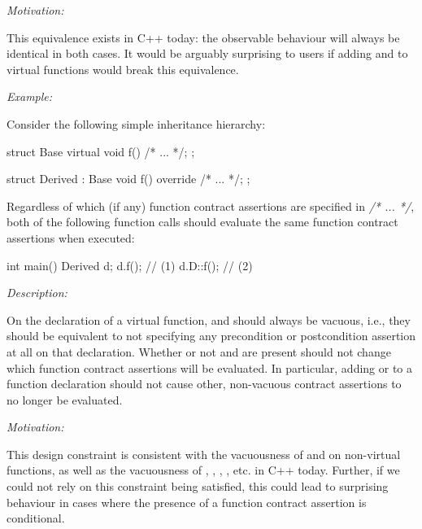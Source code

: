 \emph{Motivation:}

This equivalence exists in C++ today: the observable behaviour will always be identical in both cases. It would be arguably surprising to users if adding  and  to virtual functions would break this equivalence.

\emph{Example:}

Consider the following simple inheritance hierarchy:

\begin{codeblock}
struct Base {
  virtual void f() /* ... */;
};

struct Derived : Base {
  void f() override /* ... */;
};
\end{codeblock}
Regardless of which (if any) function contract assertions are specified in \textit{/* ... */}, both of the following function calls should evaluate the same function contract assertions when executed:

\begin{codeblock}
int main() {
  Derived d;
  d.f();     // (1)
  d.D::f();  // (2)
}
\end{codeblock}



\emph{Description:} 

On the declaration of a virtual function,  and  should always be vacuous, i.e., they should be equivalent to not specifying any precondition or postcondition assertion at all on that declaration. Whether or not  and  are present should not change which function contract assertions will be evaluated. In particular, adding  or  to a function declaration should not cause other, non-vacuous contract assertions to no longer be evaluated.

\emph{Motivation:}

This design constraint is consistent with the vacuousness of  and  on non-virtual functions, as well as the vacuousness of , \mbox{}, \mbox{}, , etc. in C++ today. Further, if we could not rely on this constraint being satisfied, this could lead to surprising behaviour in cases where the presence of a function contract assertion is conditional.

